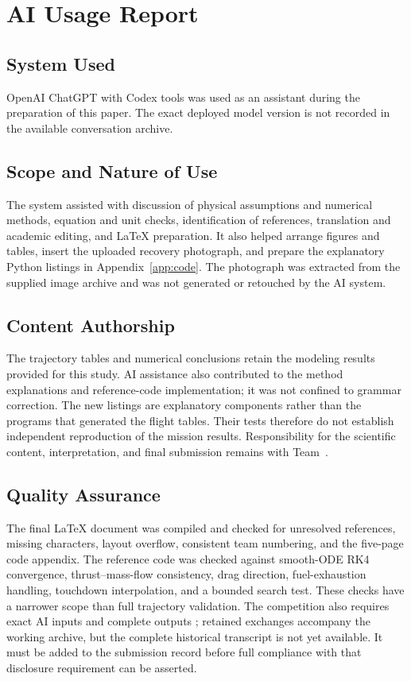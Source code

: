 \section{AI Usage Report}
\label{sec:ai}
\subsection{System Used}
OpenAI ChatGPT with Codex tools was used as an assistant during the preparation of this paper. The exact deployed model version is not recorded in the available conversation archive.

\subsection{Scope and Nature of Use}
The system assisted with discussion of physical assumptions and numerical methods, equation and unit checks, identification of references, translation and academic editing, and LaTeX preparation. It also helped arrange figures and tables, insert the uploaded recovery photograph, and prepare the explanatory Python listings in Appendix~\ref{app:code}. The photograph was extracted from the supplied image archive and was not generated or retouched by the AI system.

\subsection{Content Authorship}
The trajectory tables and numerical conclusions retain the modeling results provided for this study. AI assistance also contributed to the method explanations and reference-code implementation; it was not confined to grammar correction. The new listings are explanatory components rather than the programs that generated the flight tables. Their tests therefore do not establish independent reproduction of the mission results. Responsibility for the scientific content, interpretation, and final submission remains with Team~\TeamNumber.

\subsection{Quality Assurance}
The final LaTeX document was compiled and checked for unresolved references, missing characters, layout overflow, consistent team numbering, and the five-page code appendix. The reference code was checked against smooth-ODE RK4 convergence, thrust--mass-flow consistency, drag direction, fuel-exhaustion handling, touchdown interpolation, and a bounded search test. These checks have a narrower scope than full trajectory validation. The competition also requires exact AI inputs and complete outputs \cite{airules}; retained exchanges accompany the working archive, but the complete historical transcript is not yet available. It must be added to the submission record before full compliance with that disclosure requirement can be asserted.
